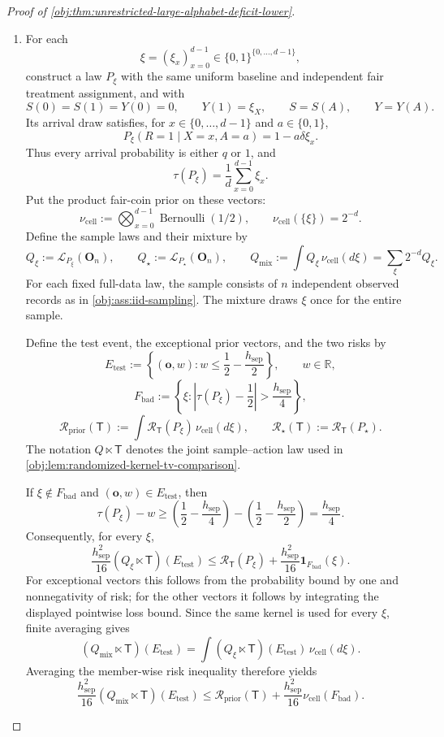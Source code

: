 \begin{proof}[Proof of \cref{obj:thm:unrestricted-large-alphabet-deficit-lower}]
\begin{enumerate}
\item For each
\[
\xi=(\xi_x)_{x=0}^{d-1}\in\{0,1\}^{\{0,\ldots,d-1\}},
\]
construct a law \(P_\xi\) with the same uniform baseline and independent fair treatment assignment, and with
\[
S(0)=S(1)=Y(0)=0,\qquad Y(1)=\xi_X,
\qquad S=S(A),\qquad Y=Y(A).
\]
Its arrival draw satisfies, for \(x\in\{0,\ldots,d-1\}\) and \(a\in\{0,1\}\),
\[
P_\xi(R=1\mid X=x,A=a)=1-a\delta\xi_x.
\]
Thus every arrival probability is either \(q\) or \(1\), and
\[
\tau(P_\xi)
=\frac1d\sum_{x=0}^{d-1}\xi_x.
\]
Put the product fair-coin prior on these vectors:
\[
\nu_{\mathrm{cell}}
:=\bigotimes_{x=0}^{d-1}\operatorname{Bernoulli}(1/2),
\qquad
\nu_{\mathrm{cell}}(\{\xi\})=2^{-d}.
\]
Define the sample laws and their mixture by
\[
Q_\xi:=\mathcal L_{P_\xi}(\mathbf O_n),
\qquad
Q_\star:=\mathcal L_{P_\star}(\mathbf O_n),
\qquad
Q_{\mathrm{mix}}
:=\int Q_\xi\,\nu_{\mathrm{cell}}(d\xi)
=\sum_\xi2^{-d}Q_\xi.
\]
For each fixed full-data law, the sample consists of \(n\) independent observed records as in \cref{obj:ass:iid-sampling}. The mixture draws \(\xi\) once for the entire sample.

Define the test event, the exceptional prior vectors, and the two risks by
\[
E_{\mathrm{test}}
:=
\left\{(\mathbf o,w):
w\le\frac12-\frac{h_{\mathrm{sep}}}{2}\right\},
\qquad
w\in\mathbb R,
\]
\[
F_{\mathrm{bad}}
:=
\left\{\xi:
\left|\tau(P_\xi)-\frac12\right|>
\frac{h_{\mathrm{sep}}}{4}\right\},
\]
\[
\mathcal R_{\mathrm{prior}}(\mathsf T)
:=\int\mathcal R_{\mathsf T}(P_\xi)\,\nu_{\mathrm{cell}}(d\xi),
\qquad
\mathcal R_\star(\mathsf T):=\mathcal R_{\mathsf T}(P_\star).
\]
The notation \(Q\ltimes\mathsf T\) denotes the joint sample--action law used in
\cref{obj:lem:randomized-kernel-tv-comparison}.

If \(\xi\notin F_{\mathrm{bad}}\) and \((\mathbf o,w)\in E_{\mathrm{test}}\), then
\[
\tau(P_\xi)-w
\ge
\left(\frac12-\frac{h_{\mathrm{sep}}}{4}\right)
-\left(\frac12-\frac{h_{\mathrm{sep}}}{2}\right)
=\frac{h_{\mathrm{sep}}}{4}.
\]
Consequently, for every \(\xi\),
\[
\frac{h_{\mathrm{sep}}^2}{16}
(Q_\xi\ltimes\mathsf T)(E_{\mathrm{test}})
\le
\mathcal R_{\mathsf T}(P_\xi)
+\frac{h_{\mathrm{sep}}^2}{16}
\mathbf1_{F_{\mathrm{bad}}}(\xi).
\]
For exceptional vectors this follows from the probability bound by one and nonnegativity of risk; for the other vectors it follows by integrating the displayed pointwise loss bound. Since the same kernel is used for every \(\xi\), finite averaging gives
\[
(Q_{\mathrm{mix}}\ltimes\mathsf T)(E_{\mathrm{test}})
=
\int
(Q_\xi\ltimes\mathsf T)(E_{\mathrm{test}})
\,\nu_{\mathrm{cell}}(d\xi).
\]
Averaging the member-wise risk inequality therefore yields
\[
\frac{h_{\mathrm{sep}}^2}{16}
(Q_{\mathrm{mix}}\ltimes\mathsf T)(E_{\mathrm{test}})
\le
\mathcal R_{\mathrm{prior}}(\mathsf T)
+\frac{h_{\mathrm{sep}}^2}{16}\nu_{\mathrm{cell}}(F_{\mathrm{bad}}).
\]


\end{enumerate}
\end{proof}
